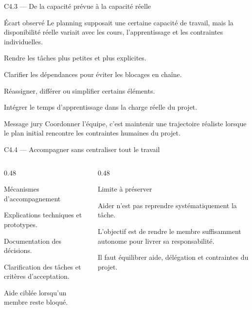 
\begin{frame}{C4.3 — De la capacité prévue à la capacité réelle}
\begin{block}{Écart observé}
Le planning supposait une certaine capacité de travail, mais la disponibilité réelle variait avec les cours, l'apprentissage et les contraintes individuelles.
\end{block}
\begin{tightitems}
  \item Rendre les tâches plus petites et plus explicites.
  \item Clarifier les dépendances pour éviter les blocages en chaîne.
  \item Réassigner, différer ou simplifier certains éléments.
  \item Intégrer le temps d'apprentissage dans la charge réelle du projet.
\end{tightitems}
\begin{block}{Message jury}
Coordonner l'équipe, c'est maintenir une trajectoire réaliste lorsque le plan initial rencontre les contraintes humaines du projet.
\end{block}
\end{frame}

\begin{frame}{C4.4 — Accompagner sans centraliser tout le travail}
\begin{columns}[T]
\begin{column}{0.48\linewidth}
\begin{block}{Mécanismes d'accompagnement}
\begin{tightitems}
  \item Explications techniques et prototypes.
  \item Documentation des décisions.
  \item Clarification des tâches et critères d'acceptation.
  \item Aide ciblée lorsqu'un membre reste bloqué.
\end{tightitems}
\end{block}
\end{column}
\begin{column}{0.48\linewidth}
\begin{block}{Limite à préserver}
\begin{tightitems}
  \item Aider n'est pas reprendre systématiquement la tâche.
  \item L'objectif est de rendre le membre suffisamment autonome pour livrer sa responsabilité.
  \item Il faut équilibrer aide, délégation et contraintes du projet.
\end{tightitems}
\end{block}
\end{column}
\end{columns}
\end{frame}

